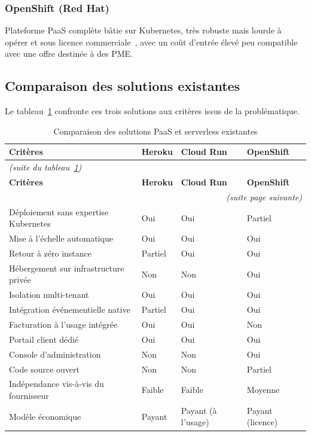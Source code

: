 \subsubsection*{OpenShift (Red Hat)}
Plateforme PaaS complète bâtie sur Kubernetes, très robuste mais lourde à opérer et sous licence commerciale~\cite{OpenShift}, avec un coût d'entrée élevé peu compatible avec une offre destinée à des PME.

\subsection*{Comparaison des solutions existantes}
Le tableau~\ref{tab:comparaison_paas} confronte ces trois solutions aux critères issus de la problématique.

\renewcommand{\arraystretch}{1.3}
\begin{longtable}{|p{5.2cm}|p{2.8cm}|p{2.8cm}|p{2.8cm}|}
\caption{Comparaison des solutions PaaS et serverless existantes}
\label{tab:comparaison_paas}\\
\hline
\textbf{Critères} & \textbf{Heroku} & \textbf{Cloud Run} & \textbf{OpenShift} \\
\hline
\endfirsthead

\multicolumn{4}{l}{\small\itshape (suite du tableau~\ref{tab:comparaison_paas})}\\
\hline
\textbf{Critères} & \textbf{Heroku} & \textbf{Cloud Run} & \textbf{OpenShift} \\
\hline
\endhead

\hline
\multicolumn{4}{r}{\small\itshape (suite page suivante)}\\
\endfoot

\hline
\endlastfoot

Déploiement sans expertise Kubernetes & Oui & Oui & Partiel \\
\hline
Mise à l'échelle automatique & Oui & Oui & Oui \\
\hline
Retour à zéro instance & Partiel & Oui & Oui \\
\hline
Hébergement sur infrastructure privée & Non & Non & Oui \\
\hline
Isolation multi-tenant & Oui & Oui & Oui \\
\hline
Intégration événementielle native & Partiel & Oui & Oui \\
\hline
Facturation à l'usage intégrée & Oui & Oui & Non \\
\hline
Portail client dédié & Oui & Oui & Oui \\
\hline
Console d'administration & Non & Non & Oui \\
\hline
Code source ouvert & Non & Non & Partiel \\
\hline
Indépendance vis-à-vis du fournisseur & Faible & Faible & Moyenne \\
\hline
Modèle économique & Payant & Payant (à l'usage) & Payant (licence) \\
\hline
\end{longtable}
